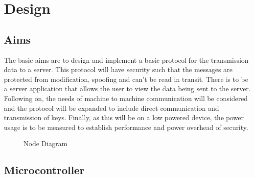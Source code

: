 
\chapter{Design}
\label{design}

\section{Aims}

The basic aims are to design and implement a basic protocol for the transmission data to a server. This protocol will have security such that the messages are protected from modification, spoofing and can't be read in transit. There is to be a server application that allows the user to view the data being sent to the server.
Following on, the needs of machine to machine communication will be considered and the protocol will be expanded to include direct communication and transmission of keys. Finally, as this will be on a low powered device, the power usage is to be measured to establish performance and power overhead of security. 


\begin{figure}[H]
\centering
{}
\caption{Node Diagram}
\label{dia:node}
\end{figure}


\section{Microcontroller}

